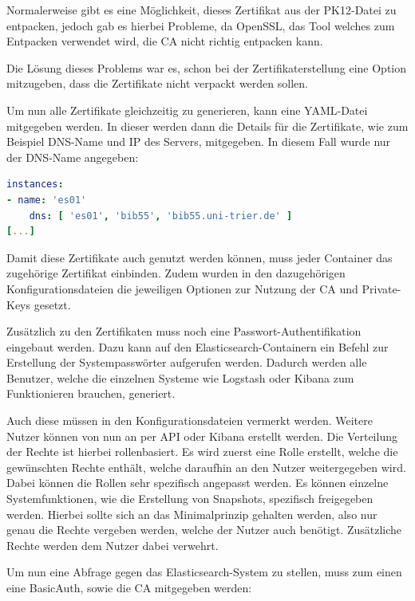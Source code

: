 Normalerweise gibt es eine Möglichkeit, dieses Zertifikat aus der PK12-Datei zu entpacken, jedoch gab es hierbei Probleme, da OpenSSL, das Tool welches zum Entpacken verwendet wird, die CA nicht richtig entpacken kann. \cite{nerophon.2018}

Die Lösung dieses Problems war es, schon bei der Zertifikaterstellung eine Option mitzugeben, dass die Zertifikate nicht verpackt werden sollen. 

Um nun alle Zertifikate gleichzeitig zu generieren, kann eine YAML-Datei mitgegeben werden. In dieser werden dann die Details für die Zertifikate, wie zum Beispiel DNS-Name und IP des Servers, mitgegeben. In diesem Fall wurde nur der DNS-Name angegeben:
\newpage

\begin{lstlisting}[language=YAML, frame=single, label={lst:certs-yml}, caption=Auschnitt aus der Konfigurationsdatei für die Zertifikatgenerierung,captionpos=b] 
instances:
- name: 'es01'
	dns: [ 'es01', 'bib55', 'bib55.uni-trier.de' ]
[...]
\end{lstlisting}

Damit diese Zertifikate auch genutzt werden können, muss jeder Container das zugehörige Zertifikat einbinden. Zudem wurden in den dazugehörigen Konfigurationsdateien die jeweiligen Optionen zur Nutzung der CA und Private-Keys gesetzt.

Zusätzlich zu den Zertifikaten muss noch eine Passwort-Authentifikation eingebaut werden. Dazu kann auf den Elasticsearch-Containern ein Befehl zur Erstellung der Systempasswörter aufgerufen werden. Dadurch werden alle Benutzer, welche die einzelnen Systeme wie Logstash oder Kibana zum Funktionieren brauchen, generiert.

Auch diese müssen in den Konfigurationsdateien vermerkt werden. Weitere Nutzer können von nun an per API oder Kibana erstellt werden. Die Verteilung der Rechte ist hierbei rollenbasiert. Es wird zuerst eine Rolle erstellt, welche die gewünschten Rechte enthält, welche daraufhin an den Nutzer weitergegeben wird. Dabei können die Rollen sehr spezifisch angepasst werden. Es können einzelne Systemfunktionen, wie die Erstellung von Snapshots, spezifisch freigegeben werden. Hierbei sollte sich an das Minimalprinzip gehalten werden, also nur genau die Rechte vergeben werden, welche der Nutzer auch benötigt. Zusätzliche Rechte werden dem Nutzer dabei verwehrt. \cite{ElasticsearchB.V..13.2.2020}

Um nun eine Abfrage gegen das Elasticsearch-System zu stellen, muss zum einen eine BasicAuth, sowie die CA mitgegeben werden:

